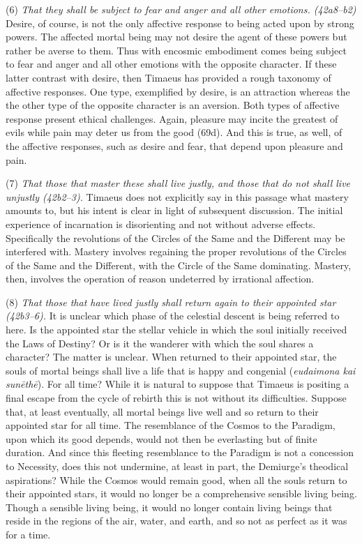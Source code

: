 (6) \emph{That they shall be subject to fear and anger and all other emotions. (42a8--b2)} Desire, of course, is not the only affective response to being acted upon by strong powers. The affected mortal being may not desire the agent of these powers but rather be averse to them. Thus with encosmic embodiment comes being subject to fear and anger and all other emotions with the opposite character. If these latter contrast with desire, then Timaeus has provided a rough taxonomy of affective responses. One type, exemplified by desire, is an attraction whereas the the other type of the opposite character is an aversion. Both types of affective response present ethical challenges. Again, pleasure may incite the greatest of evils while pain may deter us from the good (69d). And this is true, as well, of the affective responses, such as desire and fear, that depend upon pleasure and pain.

(7) \emph{That those that master these shall live justly, and those that do not shall live unjustly (42b2--3).} Timaeus does not explicitly say in this passage what mastery amounts to, but his intent is clear in light of subsequent discussion. The initial experience of incarnation is disorienting and not without adverse effects. Specifically the revolutions of the Circles of the Same and the Different may be interfered with. Mastery involves regaining the proper revolutions of the Circles of the Same and the Different, with the Circle of the Same dominating. Mastery, then, involves the operation of reason undeterred by irrational affection.

(8) \emph{That those that have lived justly shall return again to their appointed star (42b3--6).} It is unclear which phase of the celestial descent is being referred to here. Is the appointed star the stellar vehicle in which the soul initially received the Laws of Destiny? Or is it the wanderer with which the soul shares a character? The matter is unclear. When returned to their appointed star, the souls of mortal beings shall live a life that is happy and congenial (\emph{eudaimona kai sunēthē}). For all time? While it is natural to suppose that Timaeus is positing a final escape from the cycle of rebirth this is not without its difficulties. Suppose that, at least eventually, all mortal beings live well and so return to their appointed star for all time. The resemblance of the Cosmos to the Paradigm, upon which its good depends, would not then be everlasting but of finite duration. And since this fleeting resemblance to the Paradigm is not a concession to Necessity, does this not undermine, at least in part, the Demiurge's theodical aspirations? While the Cosmos would remain good, when all the souls return to their appointed stars, it would no longer be a comprehensive sensible living being. Though a sensible living being, it would no longer contain living beings that reside in the regions of the air, water, and earth, and so not as perfect as it was for a time.

